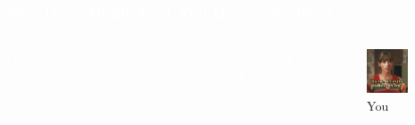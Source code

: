 \documentclass[aspectratio=169]{beamer}
\begin{document}
{
\begin{frame}
    \frametitle{\textcolor{white}{Step One: Admit That You Have a Problem}}

    \begin{columns}

        \textcolor{white}{Most of us have a (reasonable?) expectation of trust for the files on our local machine. And so, we leave things like saved passwords and other credentials and secrets pasted into text files for quick access.}

        \begin{figure}
            \centering
            \includegraphics[width=0.77\textwidth]{../static/images/problem.jpg}
            \caption{You}
            \label{fig:question}
        \end{figure}

    \end{columns}


\end{frame}
}
\end{document}
